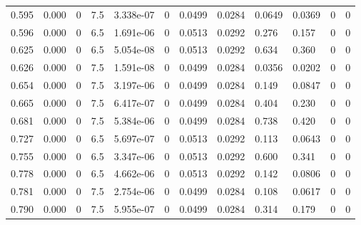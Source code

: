 \documentclass[preview]{standalone}
\begin{document}
{{\begin{tabular}{L{1.2cm}C{1.2cm} C{0.3cm}C{0.5cm} C{1.4cm}C{1.4cm} C{1.4cm}C{1.4cm} C{1.6cm}C{1.6cm} C{1.6cm}C{1.6cm}}
  0.595  &  0.000  & 0     & 7.5 &  3.338e-07  & 0  &  0.0499&   0.0284& 0.0649 & 0.0369   &  0 & 0  \\ 
  0.596  &  0.000  & 0     & 6.5 &  1.691e-06  & 0  &  0.0513&   0.0292& 0.276 & 0.157   &  0 & 0  \\ 
  0.625  &  0.000  & 0     & 6.5 &  5.054e-08  & 0  &  0.0513&   0.0292& 0.634 & 0.360   &  0 & 0  \\ 
  0.626  &  0.000  & 0     & 7.5 &  1.591e-08  & 0  &  0.0499&   0.0284& 0.0356 & 0.0202   &  0 & 0  \\ 
  0.654  &  0.000  & 0     & 7.5 &  3.197e-06  & 0  &  0.0499&   0.0284& 0.149 & 0.0847   &  0 & 0  \\ 
  0.665  &  0.000  & 0     & 7.5 &  6.417e-07  & 0  &  0.0499&   0.0284& 0.404 & 0.230   &  0 & 0  \\ 
  0.681  &  0.000  & 0     & 7.5 &  5.384e-06  & 0  &  0.0499&   0.0284& 0.738 & 0.420   &  0 & 0  \\ 
  0.727  &  0.000  & 0     & 6.5 &  5.697e-07  & 0  &  0.0513&   0.0292& 0.113 & 0.0643   &  0 & 0  \\ 
  0.755  &  0.000  & 0     & 6.5 &  3.347e-06  & 0  &  0.0513&   0.0292& 0.600 & 0.341   &  0 & 0  \\ 
  0.778  &  0.000  & 0     & 6.5 &  4.662e-06  & 0  &  0.0513&   0.0292& 0.142 & 0.0806   &  0 & 0  \\ 
  0.781  &  0.000  & 0     & 7.5 &  2.754e-06  & 0  &  0.0499&   0.0284& 0.108 & 0.0617   &  0 & 0  \\ 
  0.790  &  0.000  & 0     & 7.5 &  5.955e-07  & 0  &  0.0499&   0.0284& 0.314 & 0.179   &  0 & 0  \\ 
\hline 
\end{tabular} 

}}
\end{document}
